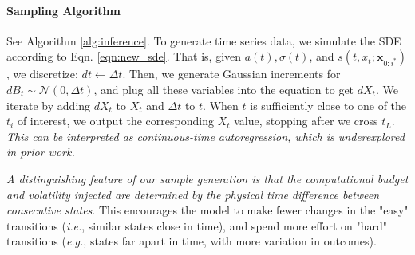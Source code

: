 \documentclass{article}
\begin{document}

\paragraph{Sampling Algorithm}
See Algorithm \ref{alg:inference}. To generate time series data, we simulate the SDE according to Eqn. \ref{eqn:new_sde}. %
That is, given $a(t), \sigma(t)$, and $s\left(t,x_t; \mathbf{x}_{0:i^*}\right)$, we discretize: $dt \leftarrow \Delta t$. Then, we generate Gaussian increments for $dB_t \sim \mathcal{N}(0, \Delta t)$, and plug all these variables into the equation to get $dX_t$. We iterate by adding $dX_t$ to $X_t$ and $\Delta t$ to $t$. When $t$ is sufficiently close to one of the $t_i$ of interest, we output the corresponding $X_t$ value, stopping after we cross $t_L$.
\textit{This can be interpreted as continuous-time autoregression, which is underexplored in prior work.}

\textit{A distinguishing feature of our sample generation is that the computational budget and volatility injected are determined by the physical time difference between consecutive states}. This encourages the model to make fewer changes in the "easy" transitions (\textit{i.e.}, similar states close in time), and spend more effort on "hard" transitions (\textit{e.g.}, states far apart in time, with more variation in outcomes).
\end{document}
